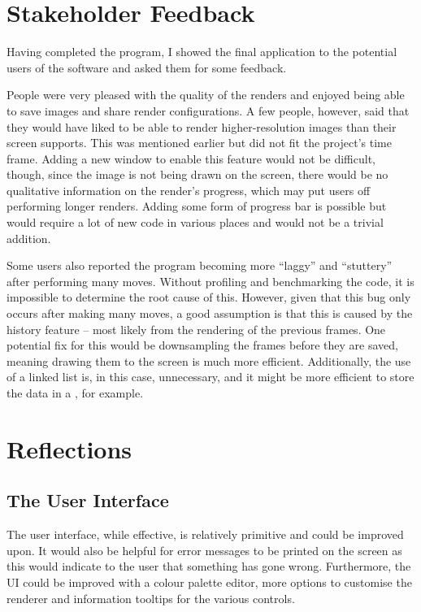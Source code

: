 \section{Stakeholder Feedback}

Having completed the program, I showed the final application to the potential users of the software and asked them for some feedback.

People were very pleased with the quality of the renders and enjoyed being able to save images and share render configurations. A few people, however, said that they would have liked to be able to render higher-resolution images than their screen supports. This was mentioned earlier but did not fit the project's time frame. Adding a new window to enable this feature would not be difficult, though, since the image is not being drawn on the screen, there would be no qualitative information on the render's progress, which may put users off performing longer renders. Adding some form of progress bar is possible but would require a lot of new code in various places and would not be a trivial addition.

Some users also reported the program becoming more ``laggy'' and ``stuttery'' after performing many moves. Without profiling and benchmarking the code, it is impossible to determine the root cause of this. However, given that this bug only occurs after making many moves, a good assumption is that this is caused by the history feature -- most likely from the rendering of the previous frames. One potential fix for this would be downsampling the frames before they are saved, meaning drawing them to the screen is much more efficient. Additionally, the use of a linked list is, in this case, unnecessary, and it might be more efficient to store the data in a , for example.

\section{Reflections}

\subsection{The User Interface}

The user interface, while effective, is relatively primitive and could be improved upon. It would also be helpful for error messages to be printed on the screen as this would indicate to the user that something has gone wrong. Furthermore, the UI could be improved with a colour palette editor, more options to customise the renderer and information tooltips for the various controls.


